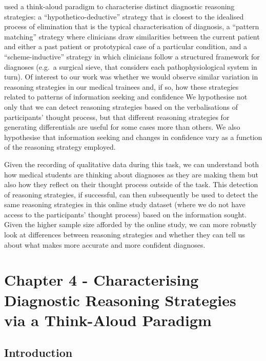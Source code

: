 \documentclass[a4paper, nobind]{templates/ociamthesis}
\begin{document}
\hfill\break
\textcite{coderre_diagnostic_2003} used a think-aloud paradigm to characterise distinct diagnostic reasoning strategies: a ``hypothetico-deductive'' strategy that is closest to the idealised process of elimination that is the typical characterisation of diagnosis, a ``pattern matching'' strategy where clinicians draw similarities between the current patient and either a past patient or prototypical case of a particular condition, and a ``scheme-inductive'' strategy in which clinicians follow a structured framework for diagnoses (e.g.~a surgical sieve, that considers each pathophysiological system in turn). Of interest to our work was whether we would observe similar variation in reasoning strategies in our medical trainees and, if so, how these strategies related to patterns of information seeking and confidence We hypothesise not only that we can detect reasoning strategies based on the verbalisations of participants' thought process, but that different reasoning strategies for generating differentials are useful for some cases more than others. We also hypothesise that information seeking and changes in confidence vary as a function of the reasoning strategy employed.

\hfill\break
Given the recording of qualitative data during this task, we can understand both how medical students are thinking about diagnoses as they are making them but also how they reflect on their thought process outside of the task. This detection of reasoning strategies, if successful, can then subsequently be used to detect the same reasoning strategies in this online study dataset (where we do not have access to the participants' thought process) based on the information sought. Given the higher sample size afforded by the online study, we can more robustly look at differences between reasoning strategies and whether they can tell us about what makes more accurate and more confident diagnoses.

\chapter*{Chapter 4 - Characterising Diagnostic Reasoning Strategies via a Think-Aloud Paradigm}\label{chapter-4---characterising-diagnostic-reasoning-strategies-via-a-think-aloud-paradigm}

\adjustmtc
{}

\section*{Introduction}\label{introduction-2}
\end{document}
